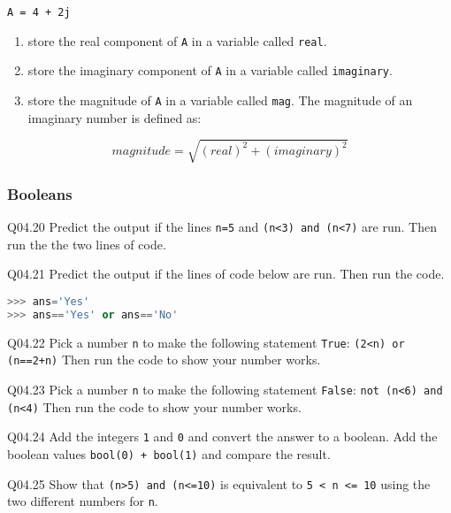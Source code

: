 \documentclass{book}
\newcommand{\passthrough}[1]{#1}
\begin{document}
\passthrough{\lstinline!A = 4 + 2j!}

\begin{enumerate}
\def\labelenumi{(\alph{enumi})}
\item
  store the real component of \passthrough{\lstinline!A!} in a variable
  called \passthrough{\lstinline!real!}.
\item
  store the imaginary component of \passthrough{\lstinline!A!} in a
  variable called \passthrough{\lstinline!imaginary!}.
\item
  store the magnitude of \passthrough{\lstinline!A!} in a variable
  called \passthrough{\lstinline!mag!}. The magnitude of an imaginary
  number is defined as:
\end{enumerate}

\[ magnitude = \sqrt{(real)^2+(imaginary)^2} \]
    




    
        \hypertarget{booleans}{%
\subsubsection{Booleans}\label{booleans}}

Q04.20 Predict the output if the lines \passthrough{\lstinline!n=5!} and
\passthrough{\lstinline!(n<3) and (n<7)!} are run. Then run the the two
lines of code.

Q04.21 Predict the output if the lines of code below are run. Then run
the code.

\begin{lstlisting}[language=Python]
>>> ans='Yes'
>>> ans=='Yes' or ans=='No'
\end{lstlisting}

Q04.22 Pick a number \passthrough{\lstinline!n!} to make the following
statement \passthrough{\lstinline!True!}:
\passthrough{\lstinline!(2<n) or (n==2+n)!} Then run the code to show
your number works.

Q04.23 Pick a number \passthrough{\lstinline!n!} to make the following
statement \passthrough{\lstinline!False!}:
\passthrough{\lstinline!not (n<6) and (n<4)!} Then run the code to show
your number works.

Q04.24 Add the integers \passthrough{\lstinline!1!} and
\passthrough{\lstinline!0!} and convert the answer to a boolean. Add the
boolean values \passthrough{\lstinline!bool(0) + bool(1)!} and compare
the result.

Q04.25 Show that \passthrough{\lstinline!(n>5) and (n<=10)!} is
equivalent to \passthrough{\lstinline!5 < n <= 10!} using the two
different numbers for \passthrough{\lstinline!n!}.
\end{document}
